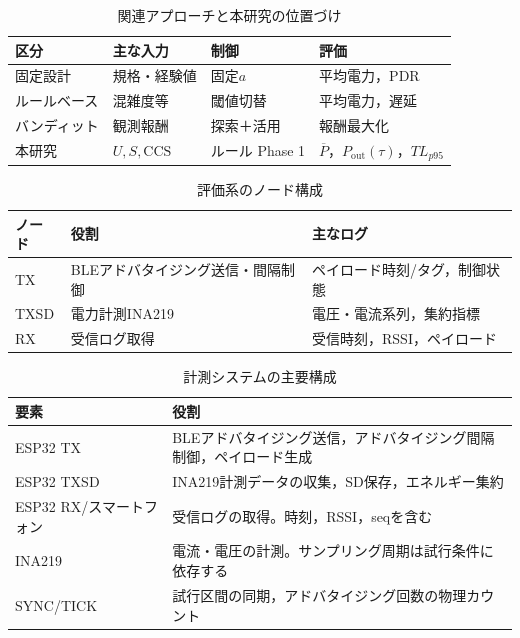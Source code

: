 \documentclass[a4paper,12pt]{ltjsreport}
\begin{document}
\clearpage
\clearpage
\begin{table}[tb]
  \centering
  \caption{関連アプローチと本研究の位置づけ}
  \begin{tabular}{llll}
    \toprule
    区分 & 主な入力 & 制御 & 評価 \\
    \midrule
    固定設計 & 規格・経験値 & 固定$a$ & 平均電力，PDR \\
    ルールベース & 混雑度等 & 閾値切替 & 平均電力，遅延 \\
    バンディット & 観測報酬 & 探索＋活用 & 報酬最大化 \\
    本研究 & $U,S,\mathrm{CCS}$ & ルール Phase 1 & $\overline{P}$，$P_{\mathrm{out}}(\tau)$，$TL_{p95}$ \\
    \bottomrule
  \end{tabular}
\end{table}
\clearpage
\clearpage
\begin{table}[tb]
  \centering
  \caption{評価系のノード構成}
  \label{tab:nodes}
  \begin{tabular}{lll}
    \toprule
    ノード & 役割 & 主なログ \\
    \midrule
    TX & BLEアドバタイジング送信・間隔制御 & ペイロード時刻/タグ，制御状態 \\
    TXSD & 電力計測INA219 & 電圧・電流系列，集約指標 \\
    RX & 受信ログ取得 & 受信時刻，RSSI，ペイロード \\
    \bottomrule
  \end{tabular}
\end{table}
\clearpage
\clearpage
\begin{table}[tb]
  \centering
  \caption{計測システムの主要構成}
  \label{tab:hw}
  \begin{tabularx}{\linewidth}{l>{\raggedright\arraybackslash}X}
    \toprule
    要素 & 役割 \\
    \midrule
    ESP32 TX & BLEアドバタイジング送信，アドバタイジング間隔制御，ペイロード生成 \\
    ESP32 TXSD & INA219計測データの収集，SD保存，エネルギー集約 \\
    ESP32 RX/スマートフォン & 受信ログの取得。時刻，RSSI，seqを含む \\
    INA219 & 電流・電圧の計測。サンプリング周期は試行条件に依存する \\
    SYNC/TICK & 試行区間の同期，アドバタイジング回数の物理カウント \\
    \bottomrule
  \end{tabularx}
\end{table}
\end{document}
